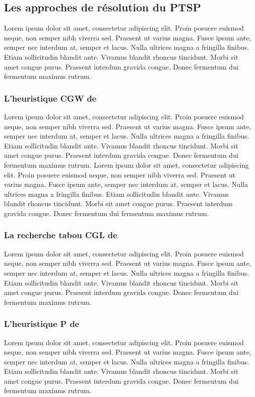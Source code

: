 \subsection{Les approches de résolution du PTSP}
Lorem ipsum dolor sit amet, consectetur adipiscing elit. Proin posuere euismod neque, non semper nibh viverra sed. Praesent ut varius magna. Fusce ipsum ante, semper nec interdum at, semper et lacus. Nulla ultrices magna a fringilla finibus. Etiam sollicitudin blandit ante. Vivamus blandit rhoncus tincidunt. Morbi sit amet congue purus. Praesent interdum gravida congue. Donec fermentum dui fermentum maximus rutrum.

\medskip

\subsubsection{L'heuristique CGW de \parencite{chao_new_1995}}
Lorem ipsum dolor sit amet, consectetur adipiscing elit. Proin posuere euismod neque, non semper nibh viverra sed. Praesent ut varius magna. Fusce ipsum ante, semper nec interdum at, semper et lacus. Nulla ultrices magna a fringilla finibus. Etiam sollicitudin blandit ante. Vivamus blandit rhoncus tincidunt. Morbi sit amet congue purus. Praesent interdum gravida congue. Donec fermentum dui fermentum maximus rutrum. Lorem ipsum dolor sit amet, consectetur adipiscing elit. Proin posuere euismod neque, non semper nibh viverra sed. Praesent ut varius magna. Fusce ipsum ante, semper nec interdum at, semper et lacus. Nulla ultrices magna a fringilla finibus. Etiam sollicitudin blandit ante. Vivamus blandit rhoncus tincidunt. Morbi sit amet congue purus. Praesent interdum gravida congue. Donec fermentum dui fermentum maximus rutrum.

\subsubsection{La recherche tabou CGL de \parencite{cordeau_tabu_1997} }
Lorem ipsum dolor sit amet, consectetur adipiscing elit. Proin posuere euismod neque, non semper nibh viverra sed. Praesent ut varius magna. Fusce ipsum ante, semper nec interdum at, semper et lacus. Nulla ultrices magna a fringilla finibus. Etiam sollicitudin blandit ante. Vivamus blandit rhoncus tincidunt. Morbi sit amet congue purus. Praesent interdum gravida congue. Donec fermentum dui fermentum maximus rutrum.

\medskip

\subsubsection{L'heuristique P de \parencite{paletta_period_2002}}
Lorem ipsum dolor sit amet, consectetur adipiscing elit. Proin posuere euismod neque, non semper nibh viverra sed. Praesent ut varius magna. Fusce ipsum ante, semper nec interdum at, semper et lacus. Nulla ultrices magna a fringilla finibus. Etiam sollicitudin blandit ante. Vivamus blandit rhoncus tincidunt. Morbi sit amet congue purus. Praesent interdum gravida congue. Donec fermentum dui fermentum maximus rutrum.


